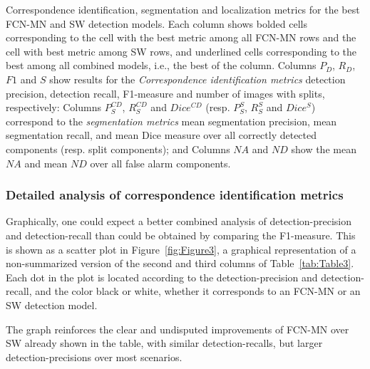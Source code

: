\documentclass[a4paper,authoryear,review]{elsarticle}
\begin{document}
\begin{table}[]
\begin{adjustbox}{angle=90}
{        }
    \end{adjustbox}
     \caption{
Correspondence identification, segmentation and localization metrics for the best FCN-MN and SW detection models.   Each column shows bolded cells corresponding to the cell with the best metric among all FCN-MN rows and the cell with best metric among SW rows, and underlined cells corresponding to the best among all combined models, i.e., the best of the column.  Columns $P_D$, $R_D$, $F1$ and $S$ show results for the \emph{Correspondence identification metrics} detection precision, detection recall, F1-measure and number of images with splits, respectively: Columns $P_S^{CD}$, $R_S^{CD}$ and $Dice^{CD}$ (resp. $P_S^S$, $R_S^S$ and $Dice^S$) correspond to the \emph{segmentation metrics} mean segmentation precision, mean segmentation recall, and mean Dice measure over all correctly detected components (resp. split components); and Columns $NA$ and $ND$ show the mean $NA$ and mean $ND$ over all false alarm components.
    }
        \label{tab:Table3}
\end{table}


\subsubsection{Detailed analysis of correspondence identification metrics}
\label{sub:compFCNSW}

Graphically, one could expect a better combined analysis of detection-precision and detection-recall than could be obtained by comparing the F1-measure. This is shown as a scatter plot in Figure~\ref{fig:Figure3}, a graphical representation of a non-summarized version of the second and third columns of Table~\ref{tab:Table3}. Each dot  in the plot is located according to the detection-precision and detection-recall, and the color black or white, whether it corresponds to an FCN-MN or an SW detection model.

The graph reinforces the clear and undisputed improvements of FCN-MN over SW already shown in the table, with similar detection-recalls, but larger detection-precisions over most scenarios. 
\end{document}
